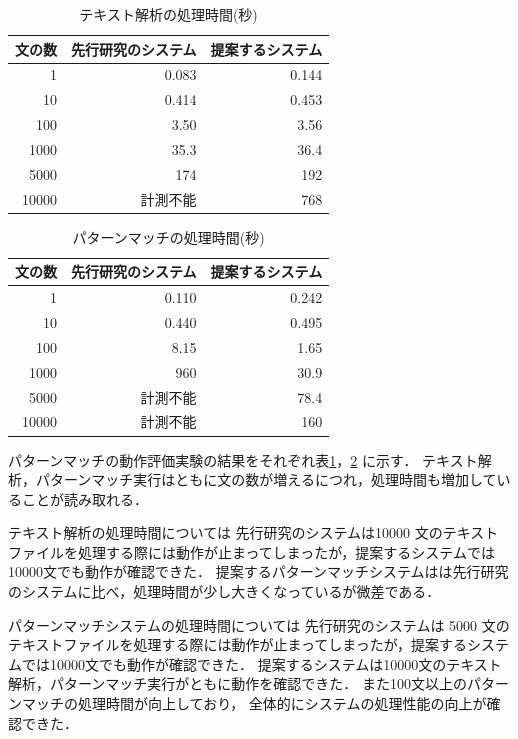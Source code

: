 \documentclass{FITpaper}
\begin{document}
\begin{table}[htbp]
  \centering
    \caption{テキスト解析の処理時間(秒)}
    \label{tbl:convert_time}
    \begin{tabular}{|r||r|r|}  
      \hline
      文の数 &先行研究のシステム& 提案するシステム \\\hline \hline
      1 & 0.083&0.144\\\hline
      10 & 0.414&0.453 \\\hline
      100 & 3.50 &3.56\\ \hline
      1000 & 35.3&36.4 \\\hline
      5000 &  174&192\\\hline
      10000 &  計測不能&768\\ \hline
    \end{tabular}
  \end{table}
\begin{table}[htbp]
  \centering
    \caption{パターンマッチの処理時間(秒)}
    \label{tbl:matching_time}
    \begin{tabular}{|r||r|r|}  
      \hline
      文の数 & 先行研究のシステム& 提案するシステム\\ \hline \hline
      1 & 0.110&0.242\\\hline
      10 & 0.440 &0.495\\\hline
      100 & 8.15&1.65\\ \hline
      1000 & 960 &30.9 \\\hline
      5000 & 計測不能 &78.4\\\hline
      10000 & 計測不能 &160\\ \hline
    \end{tabular}
  \end{table}


  パターンマッチの動作評価実験の結果をそれぞれ表\ref{tbl:convert_time}，\ref{tbl:matching_time} に示す．
  テキスト解析，パターンマッチ実行はともに文の数が増えるにつれ，処理時間も増加していることが読み取れる．

  
  テキスト解析の処理時間については
  先行研究のシステムは10000 文のテキストファイルを処理する際には動作が止まってしまったが，提案するシステムでは10000文でも動作が確認できた．
  提案するパターンマッチシステムはは先行研究のシステムに比べ，処理時間が少し大きくなっているが微差である．
 
  パターンマッチシステムの処理時間については
  先行研究のシステムは
  5000 文のテキストファイルを処理する際には動作が止まってしまったが，提案するシステムでは10000文でも動作が確認できた．
  提案するシステムは10000文のテキスト解析，パターンマッチ実行がともに動作を確認できた．
  また100文以上のパターンマッチの処理時間が向上しており，
  全体的にシステムの処理性能の向上が確認できた．
  
\end{document}
